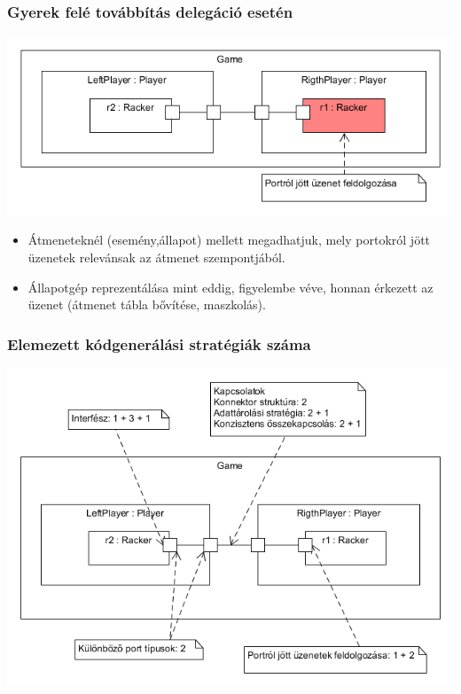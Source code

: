 \documentclass[11pt]{beamer}
\begin{document}
\begin{frame}
	\frametitle{Gyerek felé továbbítás delegáció esetén}
	\begin{center}
	\includegraphics[scale=0.5]{vedes_demo_recived_proc.png}
	\end{center}
	\begin{itemize}
	\item Átmeneteknél (esemény,állapot) mellett megadhatjuk, mely portokról jött üzenetek relevánsak az átmenet szempontjából.
	\item Állapotgép reprezentálása mint eddig, figyelembe véve, honnan érkezett az üzenet (átmenet tábla bővítése, maszkolás). 
	\end{itemize}
\end{frame}

\begin{frame}
	\frametitle{Elemezett kódgenerálási stratégiák száma}
	
	\begin{center}
	\includegraphics[scale=0.45]{vedes_demo_count.png}
	\end{center}
\end{frame}	
\end{document}
